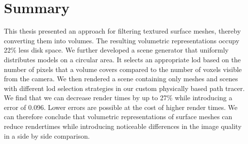 \chapter{Summary}
\label{chap:summary}
This thesis presented an approach for filtering textured surface meshes, thereby converting them into volumes.
The resulting volumetric representations occupy 22\% less disk space.
We further developed a scene generator that uniformly distributes models on a circular area.
It selects an appropriate \ac{lod} based on the number of pixels that a volume covers compared to the number of voxels visible from the camera.
We then rendered a scene containing only meshes and scenes with different \ac{lod} selection strategies in our custom physically based path tracer.
We find that we can decrease render times by up to 27\% while introducing a \FLIP error of 0.096.
Lower \FLIP errors are possible at the cost of higher render times.
We can therefore conclude that volumetric representations of surface meshes can reduce rendertimes while introducing noticeable differences in the image quality in a side by side comparison.